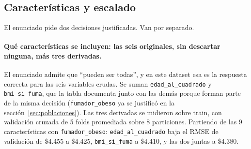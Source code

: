 \documentclass[11pt,a4paper]{article}
\begin{document}
\subsection{Características y escalado}
\label{sec:features}

El enunciado pide dos decisiones justificadas. Van por separado.

\paragraph{Qué características se incluyen: las seis originales, sin descartar ninguna, más
tres derivadas.}
El enunciado admite que ``pueden ser todas'', y en este dataset esa es la respuesta correcta
para las seis variables crudas. Se suman \texttt{edad\_al\_cuadrado} y \texttt{bmi\_si\_fuma},
que la tabla documenta junto con las demás porque forman parte de la misma decisión
(\texttt{fumador\_obeso} ya se justificó en la sección~\ref{sec:poblaciones}). Las tres
derivadas se midieron sobre train, con validación cruzada de 5 folds promediada sobre 8
particiones. Partiendo de las 9 características con \texttt{fumador\_obeso}:
\texttt{edad\_al\_cuadrado} baja el RMSE de validación de \$4.455 a \$4.425,
\texttt{bmi\_si\_fuma} a \$4.410, y las dos juntas a \$4.380.
\end{document}
